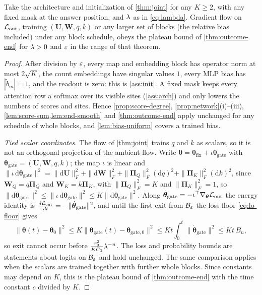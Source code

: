 \begin{corollary}
\label{cor:joint-outcome}
Take the architecture and initialization of \cref{thm:joint} for any $K\ge2$, with any fixed mask at the answer position, and $\lambda$ as in
\cref{eq:lambda}. Gradient flow on $\mathcal L_{\mathrm{out}}$, training $(\mathbf U,\mathbf W,q,k)$ or any larger set of blocks (the relative bias included) under any block
schedule, obeys the plateau bound of \cref{thm:outcome-end} for $\lambda>0$ and $\varepsilon$ in the range of that theorem.
\end{corollary}

\begin{proof}
After division by $\varepsilon$, every map and embedding block has operator norm at most $2\sqrt K$, the count embeddings have singular values
$1$, every MLP bias has $|\tilde b_m|=1$, and the readout is zero: this is \cref{ass:init}. A fixed mask keeps every attention row a softmax over
its visible sites (\cref{ass:arch}) and only lowers the numbers of scores and sites. Hence \cref{prop:score-degree}, \cref{prop:network}(i)--(iii),
\cref{lem:score-sum,lem:end-smooth} and \cref{thm:outcome-end} apply unchanged for any schedule of whole blocks, and \cref{lem:bias-uniform} covers a trained bias.

\emph{Tied scalar coordinates.} The flow of \cref{thm:joint} trains $q$ and $k$ as scalars, so it is not an orthogonal projection of
the ambient flow. Write $\bm\theta=\bm\theta_{\mathrm{fix}}+\iota\bm\theta_{\mathrm{gate}}$ with $\bm\theta_{\mathrm{gate}}=(\mathbf U,\mathbf W,q,k)$; the map $\iota$ is linear and
$\|\iota\,\mathrm d\bm\theta_{\mathrm{gate}}\|^2=\|\mathrm d\mathbf U\|_F^2+\|\mathrm d\mathbf W\|_F^2+\|\bm\Pi_Q\|_F^2(\mathrm d q)^2+\|\bm\Pi_K\|_F^2(\mathrm d k)^2$,
since $\mathbf W_Q=q\bm\Pi_Q$ and $\mathbf W_K=k\bm\Pi_K$, with $\|\bm\Pi_Q\|_F^2=K$ and $\|\bm\Pi_K\|_F^2=1$, so $\|\mathrm d\bm\theta_{\mathrm{gate}}\|^2\le\|\iota\,\mathrm d\bm\theta_{\mathrm{gate}}\|^2\le K\|\mathrm d\bm\theta_{\mathrm{gate}}\|^2$. Along
$\dot{\bm\theta}_{\mathrm{gate}}=-\iota^\top\nabla_{\bm\theta}\mathcal L_{\mathrm{out}}$ the energy identity is $\frac{d\mathcal L_{\mathrm{out}}}{dt}=-\|\dot{\bm\theta}_{\mathrm{gate}}\|^2$, and until the first exit from
$\mathcal B_{\varepsilon}$ the loss floor \cref{eq:lo-floor} gives
\[
 \|\bm\theta(t)-\bm\theta_0\|^2\le K\|\bm\theta_{\mathrm{gate}}(t)-\bm\theta_{\mathrm{gate},0}\|^2\le Kt\int_0^t\|\dot{\bm\theta}_{\mathrm{gate}}\|^2\le Kt\,B_n ,
\]
so exit cannot occur before $\frac{r_0^2}{KC_2}\lambda^{-n}$. The loss and probability bounds are statements about logits on $\mathcal B_{\varepsilon}$ and
hold unchanged. The same comparison applies when the scalars are trained together with further whole blocks. Since constants may depend
on $K$, this is the plateau bound of \cref{thm:outcome-end} with the time constant $c$ divided by $K$.
\end{proof}

